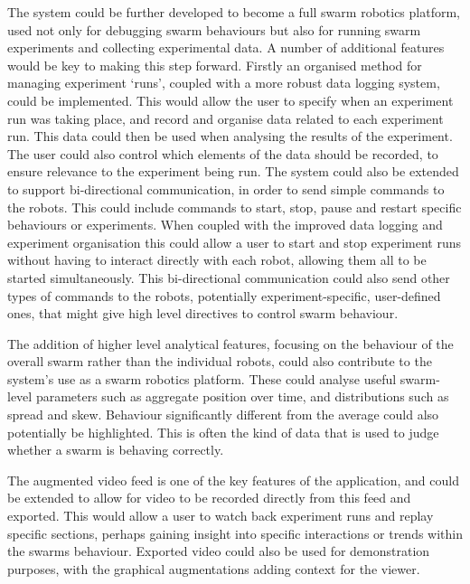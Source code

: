 The system could be further developed to become a full swarm robotics platform, used not only for debugging swarm behaviours but also for running swarm experiments and collecting experimental data. A number of additional features would be key to making this step forward. Firstly an organised method for managing experiment `runs', coupled with a more robust data logging system, could be implemented. This would allow the user to specify when an experiment run was taking place, and record and organise data related to each experiment run. This data could then be used when analysing the results of the experiment. The user could also control which elements of the data should be recorded, to ensure relevance to the experiment being run. The system could also be extended to support bi-directional communication, in order to send simple commands to the robots. This could include commands to start, stop, pause and restart specific behaviours or experiments. When coupled with the improved data logging and experiment organisation this could allow a user to start and stop experiment runs without having to interact directly with each robot, allowing them all to be started simultaneously. This bi-directional communication could also send other types of commands to the robots, potentially experiment-specific, user-defined ones, that might give high level directives to control swarm behaviour.

The addition of higher level analytical features, focusing on the behaviour of the overall swarm rather than the individual robots, could also contribute to the system's use as a swarm robotics platform. These could analyse useful swarm-level parameters such as aggregate position over time, and distributions such as spread and skew. Behaviour significantly different from the average could also potentially be highlighted. This is often the kind of data that is used to judge whether a swarm is behaving correctly.

The augmented video feed is one of the key features of the application, and could be extended to allow for video to be recorded directly from this feed and exported. This would allow a user to watch back experiment runs and replay specific sections, perhaps gaining insight into specific interactions or trends within the swarms behaviour. Exported video could also be used for demonstration purposes, with the graphical augmentations adding context for the viewer.


